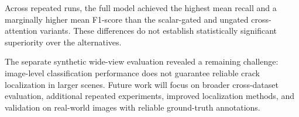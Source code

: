 \documentclass[12pt,a4paper,oneside]{article}
\begin{document}
Across repeated runs, the full model achieved the highest
mean recall and a marginally higher mean F1-score than the
scalar-gated and ungated cross-attention variants. These
differences do not establish statistically significant
superiority over the alternatives.

The separate synthetic wide-view evaluation revealed a
remaining challenge: image-level classification performance
does not guarantee reliable crack localization in larger
scenes. Future work will focus on broader cross-dataset
evaluation, additional repeated experiments, improved
localization methods, and validation on real-world images
with reliable ground-truth annotations.



\end{document}
